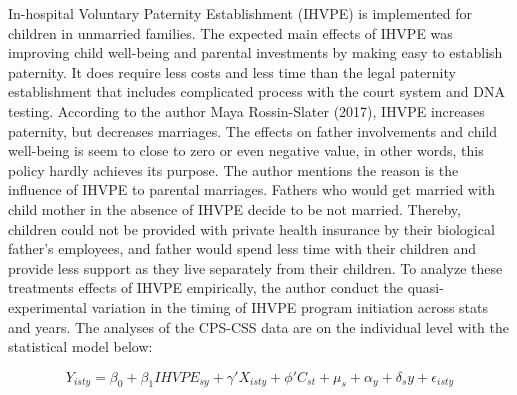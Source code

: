 \documentclass[11pt,a4paper]{article}
\begin{document}
In-hospital Voluntary Paternity Establishment (IHVPE) is implemented for
children in unmarried families. The expected main effects of IHVPE was
improving child well-being and parental investments by making easy
to establish paternity. It does require less costs and less time than
the legal paternity establishment that includes complicated process with
the court system and DNA testing. According to the author Maya
Rossin-Slater (2017), IHVPE increases paternity, but decreases
marriages. The effects on father involvements and child well-being is
seem to close to zero or even negative value, in other words, this
policy hardly achieves its purpose. The author mentions the reason is
the influence of IHVPE to parental marriages. Fathers who would get
married with child mother in the absence of IHVPE decide to be not
married. Thereby, children could not be provided with private health
insurance by their biological father's employees, and father would spend
less time with their children and provide less support as they live
separately from their children. To analyze these treatments effects of
IHVPE empirically, the author conduct the quasi-experimental variation
in the timing of IHVPE program initiation across stats and years. The
analyses of the CPS-CSS data are on the individual level with the
statistical model below:

\begin{equation}
Y_{isty} = \beta_{0} + \beta_{1}  IHVPE_{sy} +
\gamma'  X_{isty} + \phi'  C_{st} + \mu_{s} + \alpha_{y} + \delta_{s}
 y + \epsilon_{isty}
\end{equation}
\end{document}
